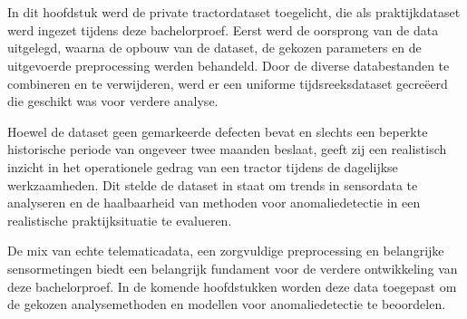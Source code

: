 
\section{}%
\label{sec: Besluit}

In dit hoofdstuk werd de private tractordataset toegelicht, die als praktijkdataset werd ingezet tijdens deze bachelorproef. Eerst werd de oorsprong van de data uitgelegd, waarna de opbouw van de dataset, de gekozen parameters en de uitgevoerde preprocessing werden behandeld. Door de diverse databestanden te combineren en te verwijderen, werd er een uniforme tijdsreeksdataset gecreëerd die geschikt was voor verdere analyse.

Hoewel de dataset geen gemarkeerde defecten bevat en slechts een beperkte historische periode van ongeveer twee maanden beslaat, geeft zij een realistisch inzicht in het operationele gedrag van een tractor tijdens de dagelijkse werkzaamheden. Dit stelde de dataset in staat om trends in sensordata te analyseren en de haalbaarheid van methoden voor anomaliedetectie in een realistische praktijksituatie te evalueren.

De mix van echte telematicadata, een zorgvuldige preprocessing en belangrijke sensormetingen biedt een belangrijk fundament voor de verdere ontwikkeling van deze bachelorproef. In de komende hoofdstukken worden deze data toegepast om de gekozen analysemethoden en modellen voor anomaliedetectie te beoordelen.


